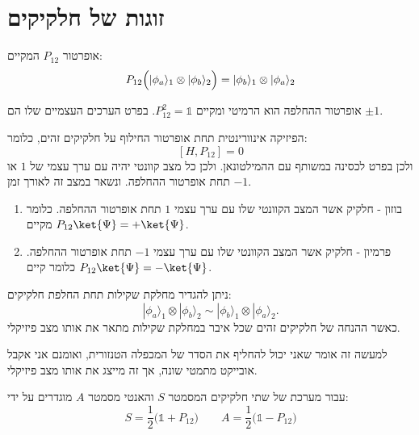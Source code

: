 \documentclass{tstextbook}
\begin{document}
\section{זוגות של חלקיקים}

\begin{definition}
אופרטור \(P_{12}\) המקיים:
$$P_{12}\Bigl(|\phi_{a}\rangle_{1}\otimes|\phi_{b}\rangle_{2}\Bigr)=|\phi_{b}\rangle_{1}\otimes|\phi_{a}\rangle_{2}$$

\end{definition}
\begin{corollary}
אופרטור ההחלפה הוא הרמיטי ומקיים \(P^{2}_{12}=\mathbb{1}\). בפרט הערכים העצמיים שלו הם \(\pm 1\).

\end{corollary}
\begin{proposition}
הפיזיקה אינוורינטית תחת אופרטור החילוף על חלקיקים זהים, כלומר:
$$[H,P_{12}]=0$$
ולכן בפרט לכסינה במשותף עם ההמילטונאן. ולכן כל מצב קוונטי יהיה עם ערך עצמי של \(1\) או \(-1\) תחת אופרטור ההחלפה. ונשאר במצב זה לאורך זמן.

\end{proposition}
\begin{definition}
  \begin{enumerate}
    \item בוזון - חלקיק אשר המצב הקוונטי שלו עם ערך עצמי \(1\) תחת אופרטור ההחלפה. כלומר מקיים \(P_{12}\ket{\Psi}=+\ket{\Psi}\). 


    \item פרמיון - חלקיק אשר המצב הקוונטי שלו עם ערך עצמי \(-1\) תחת אופרטור ההחלפה. כלומר קיים \(P_{12}\ket{\Psi}=-\ket{\Psi}\). 


  \end{enumerate}
\end{definition}
\begin{proposition}
ניתן להגדיר מחלקת שקילות תחת החלפת חלקיקים:
$$|\phi_{a}\rangle_{1}\otimes|\phi_{b}\rangle_{2}\sim|\phi_{b}\rangle_{1}\otimes|\phi_{a}\rangle_{2}.$$
כאשר ההנחה של חלקיקים זהים שכל איבר במחלקת שקילות מתאר את אותו מצב פיזיקלי. 

\end{proposition}
\begin{remark}
למעשה זה אומר שאני יכול להחליף את הסדר של המכפלה הטנזורית, ואומנם אני אקבל אובייקט מתמטי שונה, אך זה מייצג את אותו מצב פיזיקלי. 

\end{remark}
\begin{definition}
עבור מערכת של שתי חלקיקים המסמטר \(S\) והאנטי מסמטר \(A\) מוגדרים על ידי:
$$S=\frac{1}{2}\Big(\mathbb{1} +P_{12}\Big)\qquad A=\frac{1}{2}\Big(\mathbb{1} -P_{12}\Big)$$

\end{definition}
\end{document}
